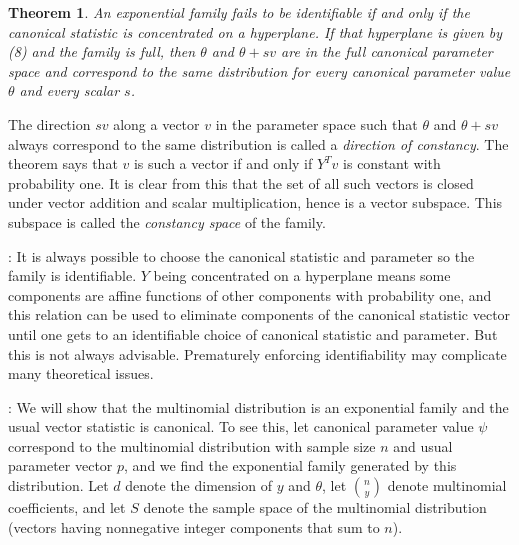 \documentclass[12pt]{article}
\newtheorem{thm}{Theorem}
\begin{document}
\begin{thm}
An exponential family fails to be identifiable if and only if the canonical statistic is concentrated on a hyperplane. If that hyperplane is given by (8) and the family is full, then $\theta$ and $\theta+sv$ are in the full canonical parameter space and correspond to the same distribution for every canonical parameter value $\theta$ and every scalar $s$. 	
\end{thm}
 

The direction $sv$ along a vector $v$ in the parameter space such that $\theta$ and $\theta + sv$ always correspond to the same distribution is called a \emph{direction of constancy}. The theorem says that $v$ is such a vector if and only if $Y^Tv$ is constant with probability one. It is clear from this that the set of all such vectors is closed under vector addition and scalar multiplication, hence is a vector subspace. This subspace is called the \emph{constancy space} of the family. \vspace{0.5cm}

: It is always possible to choose the canonical statistic and parameter so the family is identifiable. $Y$ being concentrated on a hyperplane means some components are affine functions of other components with probability one, and this relation can be used to eliminate components of the canonical statistic vector until one gets to an identifiable choice of canonical statistic and parameter. But this is not always advisable. Prematurely enforcing identifiability may complicate many theoretical issues.




\vspace*{0.5cm}: We will show that the multinomial distribution is an exponential family and the usual vector statistic is canonical. To see this, let canonical parameter value $\psi$ correspond to the multinomial distribution with sample size $n$ and usual parameter vector $p$, and we find the exponential family generated by this distribution. Let $d$ denote the dimension of $y$ and $\theta$, let ${n \choose y}$ denote multinomial coefficients, and let $S$ denote the sample space of the multinomial distribution (vectors having nonnegative integer components that sum to $n$). 
\end{document}
